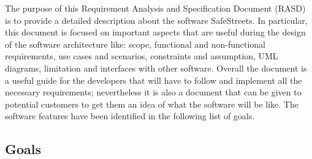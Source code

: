 The purpose of this Requirement Analysis and Specification Document (RASD)
is to provide a detailed description about the software SafeStreets.
In particular, this document is focused on important aspects that are
useful during the design of the software architecture like: scope, functional and
non-functional requirements, use cases and scenarios, constraints and assumption, UML diagrams, limitation and interfaces with other software.
Overall the document is a useful guide for the developers that will have to follow
and implement all the necessary requirements; nevertheless it is also a document
that can be given to potential customers to get them an idea of what the software
will be like.\newline
The software features have been identified in the following list of goals.

\subsection{Goals}

